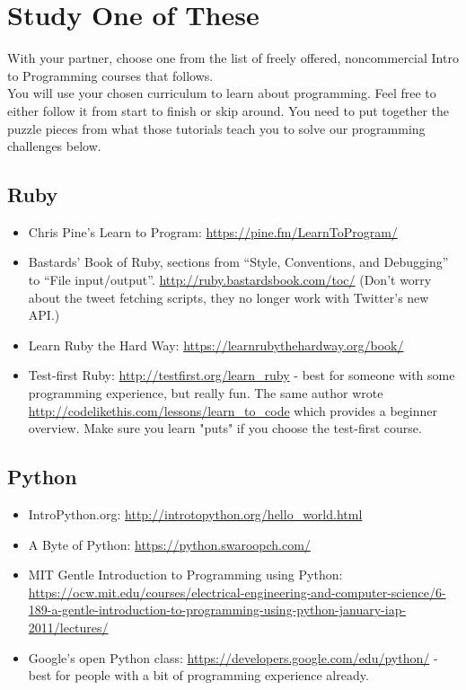 \documentclass{42-en}
\begin{document}
\chapter{Study One of These}

With your partner, choose one from the list of freely offered, noncommercial Intro to Programming courses that follows.\\

You will use your chosen curriculum to learn about programming. Feel free to either follow it from start to finish or skip around. You need to put together the puzzle pieces from what those tutorials teach you to solve our programming challenges below.

\section{Ruby}

\begin{itemize}

	\item Chris Pine’s Learn to Program: \url{https://pine.fm/LearnToProgram/}
	\item Bastards’ Book of Ruby, sections from “Style, Conventions, and Debugging” to “File input/output”. \url{http://ruby.bastardsbook.com/toc/} (Don’t worry about the tweet fetching scripts, they no longer work with Twitter’s new API.)
	\item Learn Ruby the Hard Way: \url{https://learnrubythehardway.org/book/}
	\item Test-first Ruby: \url{http://testfirst.org/learn_ruby} - best for someone with some programming experience, but really fun. The same author wrote \url{http://codelikethis.com/lessons/learn_to_code} which provides a beginner overview. Make sure you learn "puts" if you choose the test-first course.

\end{itemize}

\section{Python}

\begin{itemize}

	\item IntroPython.org: \url{http://introtopython.org/hello_world.html}
	\item A Byte of Python: \url{https://python.swaroopch.com/}
	\item MIT Gentle Introduction to Programming using Python: \url{https://ocw.mit.edu/courses/electrical-engineering-and-computer-science/6-189-a-gentle-introduction-to-programming-using-python-january-iap-2011/lectures/}
	\item Google’s open Python class: \url{https://developers.google.com/edu/python/} - best for people with a bit of programming experience already.

\end{itemize}
\end{document}
